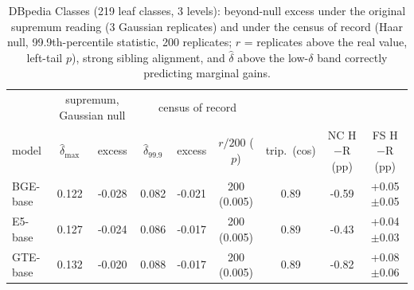 \begin{table}[H]
\centering
\footnotesize
\setlength{\tabcolsep}{2.5pt}
\begin{tabular}{lcc|ccc|ccc}
\toprule
 & \multicolumn{2}{c|}{supremum, Gaussian null} & \multicolumn{3}{c|}{census of record} & & & \\
model & $\hat\delta_{\max}$ & excess & $\hat\delta_{99.9}$ & excess & $r/200$ ($p$) & trip.\ (cos) & NC H$-$R (pp) & FS H$-$R (pp) \\
\midrule
BGE-base & 0.122 & -0.028 & 0.082 & -0.021 & 200 (0.005) & 0.89 & -0.59 & +0.05$\pm$0.05 \\
E5-base & 0.127 & -0.024 & 0.086 & -0.017 & 200 (0.005) & 0.89 & -0.43 & +0.04$\pm$0.03 \\
GTE-base & 0.132 & -0.020 & 0.088 & -0.017 & 200 (0.005) & 0.89 & -0.82 & +0.08$\pm$0.06 \\
\bottomrule
\end{tabular}
\caption{DBpedia Classes (219 leaf classes, 3 levels): beyond-null excess under the original supremum reading (3 Gaussian replicates) and under the census of record (Haar null, 99.9th-percentile statistic, 200 replicates; $r$ = replicates above the real value, left-tail $p$), strong sibling alignment, and $\hat\delta$ above the low-$\delta$ band correctly predicting marginal gains.}
\label{tab:a9}
\end{table}
